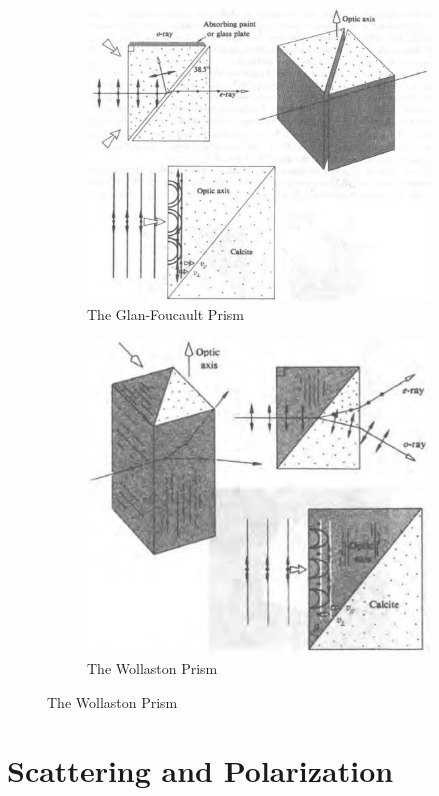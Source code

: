 \begin{figure}[H]
  \centering
  \begin{subfigure}{.45\textwidth}
    \centering
    \includegraphics[width=0.75\linewidth]{figures/Polarizer1}
    \caption{The Glan-Foucault Prism}
  \end{subfigure}
  \begin{subfigure}{.45\textwidth}
    \centering
    \includegraphics[width=0.75\linewidth]{figures/Polarizer2}
    \caption{The Wollaston Prism}
  \end{subfigure}
\end{figure}

\section{Scattering and Polarization}

